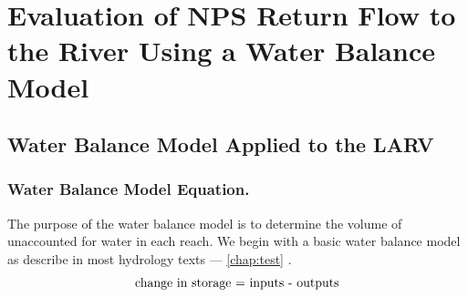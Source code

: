 \renewcommand{\thechapter}{4}
\chapter{Evaluation of NPS Return Flow to the River Using a Water Balance Model}
\label{chap:WaterBalanceModel}

\begin{linenumbers}
\section{Water Balance Model Applied to the LARV}
\label{sec:AppliedWaterModel}

\subsection*{Water Balance Model Equation.}
The purpose of the water balance model is to determine the volume of unaccounted for water in each reach.  We begin with a basic water balance model as describe in most hydrology texts --- \ref{chap:test} \parencite{wanielista1997}.
\begin{equation}
	\textnormal{change in storage = inputs - outputs} \nonumber
\end{equation}


\end{linenumbers}
